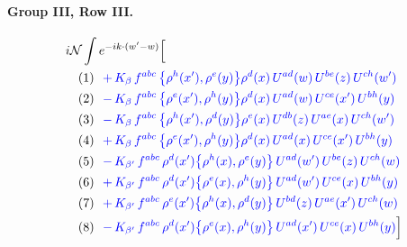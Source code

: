\documentclass[10pt]{article}
\numberwithin{equation}{section}
\newcommand{\NN}{\mathcal N}
\begin{document}
\paragraph{Group III, Row III.}
\begin{align*}
&i\NN\int e^{-ik\cdot(w'-w)}\Big[\\
&\quad\text{(1)}\ \ \textcolor{blue}{+\,K_{\beta}\,f^{abc}\,\big\{\rho^{h}(x'),\rho^{e}(y)\big\}\rho^{d}(x)\,U^{ad}(w)\,U^{be}(z)\,U^{ch}(w')}\\
&\quad\text{(2)}\ \ \textcolor{blue}{-\,K_{\beta}\,f^{abc}\,\big\{\rho^{e}(x'),\rho^{h}(y)\big\}\rho^{d}(x)\,U^{ad}(w)\,U^{ce}(x')\,U^{bh}(y)}\\
&\quad\text{(3)}\ \ \textcolor{blue}{-\,K_{\beta}\,f^{abc}\,\big\{\rho^{h}(x'),\rho^{d}(y)\big\}\rho^{e}(x)\,U^{db}(z)\,U^{ae}(x)\,U^{ch}(w')}\\
&\quad\text{(4)}\ \ \textcolor{blue}{+\,K_{\beta}\,f^{abc}\,\big\{\rho^{e}(x'),\rho^{h}(y)\big\}\rho^{d}(x)\,U^{ad}(x)\,U^{ce}(x')\,U^{bh}(y)}\\
&\quad\text{(5)}\ \ \textcolor{blue}{-\,K_{\beta'}\,f^{abc}\,\rho^{d}(x')\big\{\rho^{h}(x),\rho^{e}(y)\big\}\,U^{ad}(w')\,U^{be}(z)\,U^{ch}(w)}\\
&\quad\text{(6)}\ \ \textcolor{blue}{+\,K_{\beta'}\,f^{abc}\,\rho^{d}(x')\big\{\rho^{e}(x),\rho^{h}(y)\big\}\,U^{ad}(w')\,U^{ce}(x)\,U^{bh}(y)}\\
&\quad\text{(7)}\ \ \textcolor{blue}{+\,K_{\beta'}\,f^{abc}\,\rho^{e}(x')\big\{\rho^{h}(x),\rho^{d}(y)\big\}\,U^{bd}(z)\,U^{ae}(x')\,U^{ch}(w)}\\
&\quad\text{(8)}\ \ \textcolor{blue}{-\,K_{\beta'}\,f^{abc}\,\rho^{d}(x')\big\{\rho^{e}(x),\rho^{h}(y)\big\}\,U^{ad}(x')\,U^{ce}(x)\,U^{bh}(y)}\Big]
\end{align*}
\end{document}
